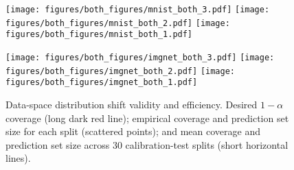 \documentclass[11pt,a4paper]{article}
\begin{document}
\begin{figure}[t]
\centering
\texttt{[image: figures/both\_figures/mnist\_both\_3.pdf]}
\texttt{[image: figures/both\_figures/mnist\_both\_2.pdf]}
\texttt{[image: figures/both\_figures/mnist\_both\_1.pdf]}

\texttt{[image: figures/both\_figures/imgnet\_both\_3.pdf]}
\texttt{[image: figures/both\_figures/imgnet\_both\_2.pdf]}
\texttt{[image: figures/both\_figures/imgnet\_both\_1.pdf]}
\caption{Data-space distribution shift validity and efficiency. Desired $1-\alpha$ coverage (long dark red line); empirical coverage and prediction set size for each split (scattered points); and mean coverage and prediction set size across 30 calibration-test splits (short horizontal lines).}
\label{fig:data_shift_results}
\end{figure}


\end{document}
